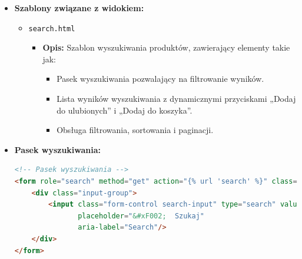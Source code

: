 \documentclass[12pt,a4paper,oneside]{article}
\theoremstyle{definition}
\numberwithin{equation}{section}
\begin{document}
\begin{itemize}
    \item \textbf{Szablony związane z widokiem:}
        \begin{itemize}
            \item \texttt{search.html}
                \begin{itemize}
                    \item \textbf{Opis:} Szablon wyszukiwania produktów, zawierający elementy takie jak:
                    \begin{itemize}
                        \item Pasek wyszukiwania pozwalający na filtrowanie wyników.
                        \item Lista wyników wyszukiwania z dynamicznymi przyciskami „Dodaj do ulubionych” i „Dodaj do koszyka”.
                        \item Obsługa filtrowania, sortowania i paginacji.
                    \end{itemize}
                \end{itemize}
        \end{itemize}

    \item \textbf{Pasek wyszukiwania:}
        \begin{lstlisting}[language=HTML, caption=Pasek wyszukiwania]
<!-- Pasek wyszukiwania -->
<form role="search" method="get" action="{% url 'search' %}" class="searchBar">
    <div class="input-group">
        <input class="form-control search-input" type="search" value="{{ request.GET.search_value }}" name="search_value"
               placeholder="&#xF002;  Szukaj"
               aria-label="Search"/>
    </div>
</form>
        \end{lstlisting}
\end{itemize}
\end{document}
